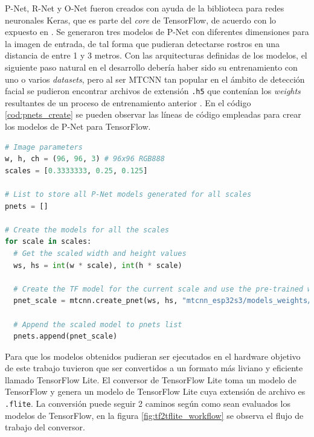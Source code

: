 P-Net, R-Net y O-Net fueron creados con ayuda de la biblioteca para redes neuronales Keras, que es parte del \textit{core} de TensorFlow, de acuerdo con lo expuesto en \cite{mtcnn_info}. Se generaron tres modelos de P-Net con diferentes dimensiones para la imagen de entrada, de tal forma que pudieran detectarse rostros en una distancia de entre 1 y 3 metros. Con las arquitecturas definidas de los modelos, el siguiente paso natural en el desarrollo debería haber sido su entrenamiento con uno o varios \textit{datasets}, pero al ser MTCNN tan popular en el ámbito de detección facial se pudieron encontrar archivos de extensión \texttt{.h5} que contenían los \textit{weights} resultantes de un proceso de entrenamiento anterior \cite{weigths_repo}. En el código \ref{cod:pnets_create} se pueden observar las líneas de código empleadas para crear los modelos de P-Net para TensorFlow.

\begin{lstlisting}[language=Python, label=cod:pnets_create, caption=Código para crear los modelos de P-Net con TensorFlow.]
# Image parameters
w, h, ch = (96, 96, 3) # 96x96 RGB888
scales = [0.3333333, 0.25, 0.125]

# List to store all P-Net models generated for all scales
pnets = []

# Create the models for all the scales
for scale in scales:
  # Get the scaled width and height values
  ws, hs = int(w * scale), int(h * scale)

  # Create the TF model for the current scale and use the pre-trained weigths
  pnet_scale = mtcnn.create_pnet(ws, hs, "mtcnn_esp32s3/models_weights/12net.h5")

  # Append the scaled model to pnets list
  pnets.append(pnet_scale)
\end{lstlisting}

Para que los modelos obtenidos pudieran ser ejecutados en el hardware objetivo de este trabajo tuvieron que ser convertidos a un formato más liviano y eficiente llamado TensorFlow Lite. El conversor de TensorFlow Lite toma un modelo de TensorFlow y genera un modelo de TensorFlow Lite cuya extensión de archivo es \texttt{.flite}. La conversión puede seguir 2 caminos según como sean evaluados los modelos de TensorFlow, en la figura \ref{fig:tf2tflite_workflow} se observa el flujo de trabajo del conversor.

